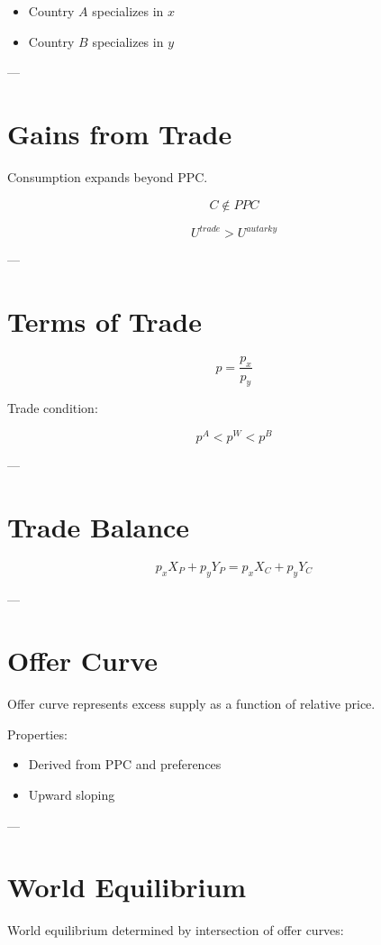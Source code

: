 \begin{itemize}
    \item Country $A$ specializes in $x$
    \item Country $B$ specializes in $y$
\end{itemize}

---

\section{Gains from Trade}

Consumption expands beyond PPC.

\[
C \notin PPC
\]

\[
U^{trade} > U^{autarky}
\]

---

\section{Terms of Trade}

\[
p = \frac{p_x}{p_y}
\]

Trade condition:

\[
p^A < p^W < p^B
\]

---

\section{Trade Balance}

\[
p_x X_P + p_y Y_P = p_x X_C + p_y Y_C
\]

---

\section{Offer Curve}

Offer curve represents excess supply as a function of relative price.

Properties:
\begin{itemize}
    \item Derived from PPC and preferences
    \item Upward sloping
\end{itemize}

---

\section{World Equilibrium}

World equilibrium determined by intersection of offer curves:

